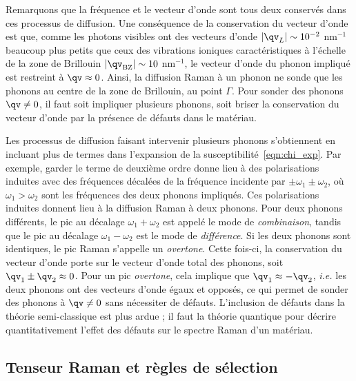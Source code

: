 Remarquons que la fréquence et le vecteur d'onde sont tous deux conservés dans ces processus de diffusion. Une conséquence de la conservation du vecteur d'onde est que, comme les photons visibles ont des vecteurs d'onde $|\qv_L|\sim 10^{-2}$ nm$^{-1}$ beaucoup plus petits que ceux des vibrations ioniques caractéristiques à l'échelle de la zone de Brillouin $|\qv_\text{BZ}|\sim 10$ nm$^{-1}$, le vecteur d'onde du phonon impliqué est restreint à $\qv\approx 0$. Ainsi, la diffusion Raman à un phonon ne sonde que les phonons au centre de la zone de Brillouin, au point $\Gamma$. Pour sonder des phonons $\qv\neq 0$, il faut soit impliquer plusieurs phonons, soit briser la conservation du vecteur d'onde par la présence de défauts dans le matériau.

Les processus de diffusion faisant intervenir plusieurs phonons s'obtiennent en incluant plus de termes dans l'expansion de la susceptibilité~\eqref{eqn:chi_exp}. Par exemple, garder le terme de deuxième ordre donne lieu à des polarisations induites avec des fréquences décalées de la fréquence incidente par $\pm\omega_1\pm\omega_2$, où $\omega_1 > \omega_2$ sont les fréquences des deux phonons impliqués. Ces polarisations induites donnent lieu à la diffusion Raman à deux phonons. Pour deux phonons différents, le pic au décalage $\omega_1+\omega_2$ est appelé le mode de \textit{combinaison}, tandis que le pic au décalage $\omega_1-\omega_2$ est le mode de \textit{différence}. Si les deux phonons sont identiques, le pic Raman s'appelle un \textit{overtone}. Cette fois-ci, la conservation du vecteur d'onde porte sur le vecteur d'onde total des phonons, soit $\qv_1\pm\qv_2\approx 0$. Pour un pic \textit{overtone}, cela implique que $\qv_1\approx-\qv_2$, \textit{i.e.} les deux phonons ont des vecteurs d'onde égaux et opposés, ce qui permet de sonder des phonons à $\qv\neq 0$ sans nécessiter de défauts. L'inclusion de défauts dans la théorie semi-classique est plus ardue ; il faut la théorie quantique pour décrire quantitativement l'effet des défauts sur le spectre Raman d'un matériau.

\subsection{Tenseur Raman et règles de sélection}

